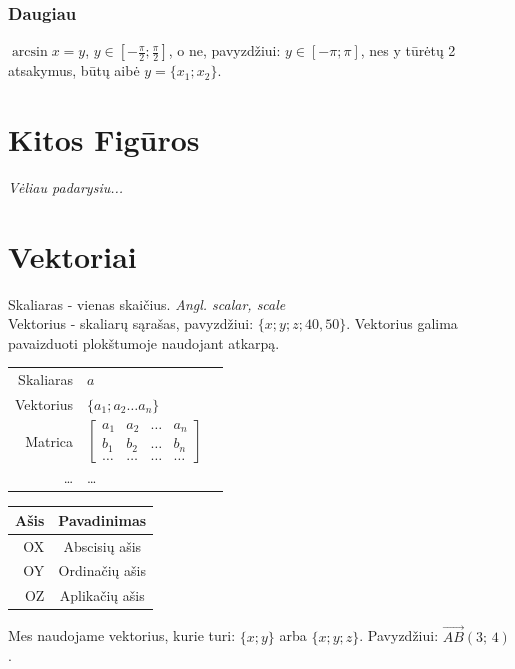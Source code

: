 \documentclass[fleqn]{article} %
\begin{document}
\subsubsection{Daugiau}

$\arcsin x = y$, $y \in [-\frac{\pi}{2}; \frac{\pi}{2}]$, o ne, pavyzdžiui: $y \in [-\pi; \pi]$, nes y tūrėtų 2 atsakymus, būtų aibė $y = \{x_1; x_2\}$.


\section{Kitos Figūros}

\textit{Vėliau padarysiu...}

\section{Vektoriai}

Skaliaras - vienas skaičius. \textit{Angl. scalar, scale} \\
Vektorius - skaliarų sąrašas, pavyzdžiui: $\{x; y; z; 40, 50\}$. Vektorius galima pavaizduoti plokštumoje naudojant atkarpą.

\begin{table}[h]
    \begin{tabular}{rll}
        Skaliaras & $a$ \\
        Vektorius & $\{a_1; a_2 \dots a_n\}$\\
        Matrica   & $\begin{bmatrix}
            a_1 & a_2 & \dots & a_n \\
            b_1 & b_2 & \dots & b_n \\
            \dots & \dots & \dots & \dots
        \end{bmatrix}$ \\
        \dots & \dots
    \end{tabular}
    \hspace{40mm}
    \begin{tabular}{rc}
        Ašis & Pavadinimas \\ \hline
        OX & Abscisių ašis \\
        OY & Ordinačių ašis \\
        OZ & Aplikačių ašis
    \end{tabular}
\end{table}
Mes naudojame vektorius, kurie turi: $\{x; y\}$ arba $\{x; y; z\}$. Pavyzdžiui: $\vec{AB}(3;\,4)$.
\end{document}
